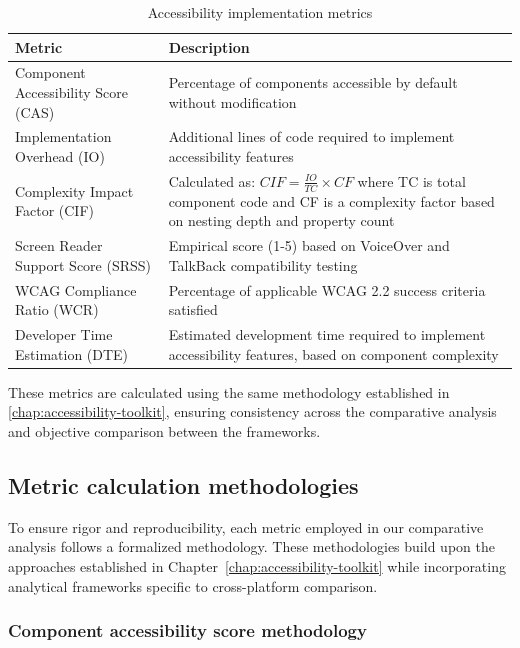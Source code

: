 \begin{table}[ht]
\caption{Accessibility implementation metrics}
\label{tab:accessibility_metrics}
\centering
\begin{tabular}{|p{4cm}|p{10cm}|}
\hline
\textbf{Metric} & \textbf{Description} \\
\hline
Component Accessibility Score (CAS) & Percentage of components accessible by default without modification \\
\hline
Implementation Overhead (IO) & Additional lines of code required to implement accessibility features \\
\hline
Complexity Impact Factor (CIF) & Calculated as: $CIF = \frac{IO}{TC} \times CF$ where TC is total component code and CF is a complexity factor based on nesting depth and property count \\
\hline
Screen Reader Support Score (SRSS) & Empirical score (1-5) based on VoiceOver and TalkBack compatibility testing \\
\hline
WCAG Compliance Ratio (WCR) & Percentage of applicable WCAG 2.2 success criteria satisfied \\
\hline
Developer Time Estimation (DTE) & Estimated development time required to implement accessibility features, based on component complexity \\
\hline
\end{tabular}
\end{table}

These metrics are calculated using the same methodology established in \ref{chap:accessibility-toolkit}, ensuring consistency across the comparative analysis and objective comparison between the frameworks.

\subsection{Metric calculation methodologies}
\label{subsec:metric-methodologies}

To ensure rigor and reproducibility, each metric employed in our comparative analysis follows a formalized methodology. These methodologies build upon the approaches established in Chapter~\ref{chap:accessibility-toolkit} while incorporating analytical frameworks specific to cross-platform comparison.

\subsubsection{Component accessibility score methodology}
\label{subsubsec:cas-methodology}

